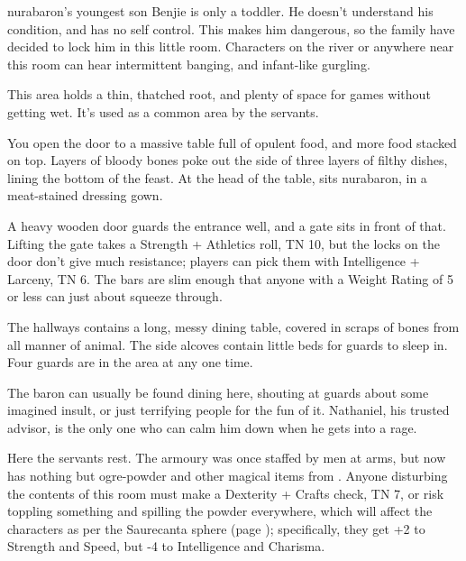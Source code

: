 \begin{multicols}{2}
\label{redChild}

\Gls{nurabaron}'s youngest son Benjie is only a toddler.
He doesn't understand his condition, and has no self control.
This makes him dangerous, so the family have decided to lock him in this little room.
Characters on the river or anywhere near this room can hear intermittent banging, and infant-like gurgling.

\label{redSmolYard}

This area holds a thin, thatched root, and plenty of space for games without getting wet.
It's used as a common area by the servants.


\label{redHall}

\begin{boxtext}

  You open the door to a massive table full of opulent food, and more food stacked on top.  Layers of bloody bones poke out the side of three layers of filthy dishes, lining the bottom of the feast.  At the head of the table, sits \gls{nurabaron}, in a meat-stained dressing gown.

\end{boxtext}

A heavy wooden door guards the entrance well, and a gate sits in front of that.  Lifting the gate takes a Strength + Athletics roll, TN 10, but the locks on the door don't give much resistance; players can pick them with Intelligence + Larceny, TN 6.  The bars are slim enough that anyone with a Weight Rating of 5 or less can just about squeeze through.

The hallways contains a long, messy dining table, covered in scraps of bones from all manner of animal.  The side alcoves contain little beds for guards to sleep in.  Four guards are in the area at any one time.

The baron can usually be found dining here, shouting at guards about some imagined insult, or just terrifying people for the fun of it.  Nathaniel, his trusted advisor, is the only one who can calm him down when he gets into a rage.

\label{redStorage}

Here the servants rest.
The armoury was once staffed by men at arms, but now has nothing but ogre-powder and other magical items from .
Anyone disturbing the contents of this room must make a Dexterity + Crafts check, TN 7, or risk toppling something and spilling the powder everywhere, which will affect the characters as per the Saurecanta sphere (page \pageref{saurecanta}); specifically, they get +2 to Strength and Speed, but -4 to Intelligence and Charisma.


\end{multicols}
